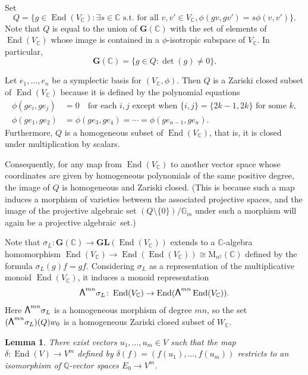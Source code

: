 \documentclass[JEP,XML,SOM,Unicode,NoFloatCountersInSection]{cedram}
\newcommand\bw{{\hbox{\large$\mathsf{\Lambda}$}}}
\newcommand{\bC}{\mathbb{C}}
\newcommand{\bG}{\mathbb{G}}
\newcommand{\bQ}{\mathbb{Q}}
\newcommand{\gG}{\mathbf{G}}
\newcommand{\gGL}{\mathbf{GL}}
\newcommand{\rM}{\mathrm{M}}
\DeclareMathOperator{\End}{End}
\let\extpower\bw
\newtheorem{lemma}{Lemma}[section]
\begin{document}
Set
\[
Q = \{ g \in \End(V_\bC) : \exists s \in \bC \text{ s.t.\ for all } v, v' \in V_\bC, \phi(gv, gv') = s \phi(v,v') \}.
\]
Note that $Q$ is equal to the union of $\gG(\bC)$ with the set of elements of $\End(V_\bC)$ whose image is contained in a $\phi$-isotropic subspace of $V_\bC$.
In particular,
\[
\gG(\bC) = \{ g \in Q : \det(g) \neq 0 \}.
\]

Let $e_1, \dotsc, e_n$ be a symplectic basis for $(V_\bC, \phi)$.
Then $Q$ is a Zariski closed subset of $\End(V_\bC)$ because it is defined by the polynomial equations
\begin{align*}
\phi(ge_i, ge_j) &= 0 \quad\text{for each } i, j \text{ except when } \{ i,j \} = \{ 2k-1,2k \} \text{ for some } k,
\\ \phi(ge_1, ge_2) &= \phi(ge_3, ge_4) = \dotsb = \phi(ge_{n-1}, ge_n).
\end{align*}
Furthermore, $Q$ is a homogeneous subset of $\End(V_\bC)$, that is, it is closed under multiplication by scalars.

Consequently, for any map from $\End(V_\bC)$ to another vector space whose coordinates are given by homogeneous polynomials of the same positive degree, the image of $Q$ is homogeneous and Zariski closed.
(This is because such a map induces a morphism of varieties between the associated projective spaces, and the image of the projective alge\-braic set $(Q \setminus \{0\})/\bG_m$ under such a morphism will again be a projective algebraic~set.)

Note that $\sigma_L : \gG(\bC) \to \gGL(\End(V_\bC))$ extends to a $\bC$-algebra homomorphism $\End(V_\bC) \to \End(\End(V_\bC)) \cong \rM_{n^2}(\bC)$ defined by the formula $\sigma_L(g)f = gf$. Considering $\sigma_L$ as a representation of the multiplicative monoid $\End(V_\bC)$, it induces a monoid representation
\[
\extpower^{mn} \sigma_L \colon\End(V_\bC) \to \End(\extpower^{mn} \End(V_\bC)).
\]
Here $\extpower^{mn} \sigma_L$ is a homogeneous morphism of degree $mn$, so the set $(\extpower^{mn} \sigma_L)(Q)w_0$ is a homogeneous Zariski closed subset of $W_\bC$.

\begin{lemma} \label{exist-u}
There exist vectors $u_1, \dotsc, u_m \!\in\! V$ such that the map \hbox{$\delta \colon \End(V) \to V^m$} defined by $\delta(f) = (f(u_1), \dotsc, f(u_m))$ restricts to an isomorphism of $\bQ$-vector spaces $E_0 \to V^m$.
\end{lemma}
\end{document}
